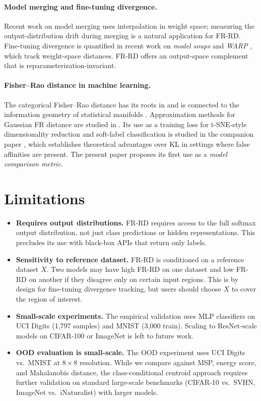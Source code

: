 \documentclass[11pt]{article}
\begin{document}
\paragraph{Model merging and fine-tuning divergence.}
Recent work on model merging \citep{wortsman2022model} uses interpolation in weight
space; measuring the output-distribution drift during merging is a natural application
for FR-RD. Fine-tuning divergence is quantified in recent work on \emph{model soups}
and \emph{WARP} \citep{rame2024warp}, which track weight-space distances. FR-RD
offers an output-space complement that is reparameterization-invariant.

\paragraph{Fisher--Rao distance in machine learning.}
The categorical Fisher--Rao distance has its roots in \citet{rao1945information}
and is connected to the information geometry of statistical manifolds
\citep{amari2016information,nielsen2020elementary}.
Approximation methods for Gaussian FR distance are studied in
\citet{nielsen2023fishrao}.
Its use as a training loss for t-SNE-style dimensionality reduction and
soft-label classification is studied in the companion paper
\citep{bottoni2026fisherrao}, which establishes theoretical advantages over KL
in settings where false affinities are present.
The present paper proposes its first use as a \emph{model comparison metric}.

\section{Limitations}

\begin{itemize}
  \item \textbf{Requires output distributions.} FR-RD requires access to the full softmax
    output distribution, not just class predictions or hidden representations. This
    precludes its use with black-box APIs that return only labels.
  \item \textbf{Sensitivity to reference dataset.} FR-RD is conditioned on a reference
    dataset $X$. Two models may have high FR-RD on one dataset and low FR-RD on another
    if they disagree only on certain input regions. This is by design for fine-tuning
    divergence tracking, but users should choose $X$ to cover the region of interest.
  \item \textbf{Small-scale experiments.} The empirical validation uses MLP classifiers
    on UCI Digits (1,797 samples) and MNIST (3,000 train). Scaling to ResNet-scale
    models on CIFAR-100 or ImageNet is left to future work.
  \item \textbf{OOD evaluation is small-scale.} The OOD experiment uses UCI Digits
    vs.\ MNIST at $8\times 8$ resolution. While we compare against MSP, energy score, and
    Mahalanobis distance, the class-conditional centroid approach requires further
    validation on standard large-scale benchmarks (CIFAR-10 vs.\ SVHN,
    ImageNet vs.\ iNaturalist) with larger models.
\end{itemize}
\end{document}
